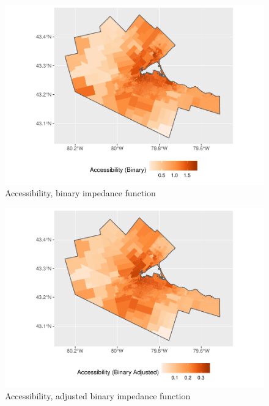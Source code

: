 \documentclass[10pt,letterpaper]{article}
\begin{document}
\begin{figure}
\includegraphics[width=0.95\linewidth]{Supply_and_Demand_Inflation_in_FCA_Methods_v2.1_files/figure-latex/fig14-map-accessibility-binary-1} \caption{\label{fig:fig14-map-accessibility-binary}Accessibility, binary impedance function}\label{fig:fig14-map-accessibility-binary}
\end{figure}

\begin{figure}
\includegraphics[width=0.95\linewidth]{Supply_and_Demand_Inflation_in_FCA_Methods_v2.1_files/figure-latex/fig15-map-accessibility-binary-adjusted-1} \caption{\label{fig:fig15-map-accessibility-binary-adjusted}Accessibility, adjusted binary impedance function}\label{fig:fig15-map-accessibility-binary-adjusted}
\end{figure}
\end{document}
